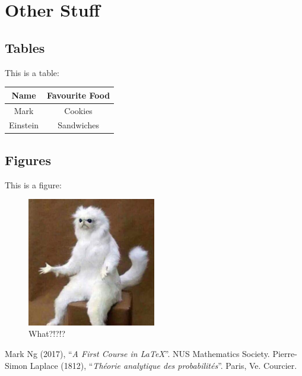 \documentclass{article}
\begin{document}
    \section{Other Stuff}
        \subsection{Tables}
            This is a table:
            \begin{center}
                \begin{tabular}{| c | c |}
                    \hline
                    Name & Favourite Food\\
                    \hline
                    Mark & Cookies\\
                    Einstein & Sandwiches\\
                    \hline
                \end{tabular}
            \end{center}
        \subsection{Figures}
            This is a figure:
            \begin{figure}[H]
                \centering
                \includegraphics[width=0.5\textwidth]{meme.jpg}
                \caption{What?!?!?}
                \label{fig: nice figure}
            \end{figure}

    \begin{thebibliography}{100}
         Mark Ng (2017), ``\emph{A First Course in \LaTeX }''. NUS Mathematics Society.
         Pierre-Simon Laplace (1812), ``\emph{Th\'{e}orie analytique des probabilit\'{e}s}''. Paris, Ve. Courcier.
    \end{thebibliography}
\end{document}
